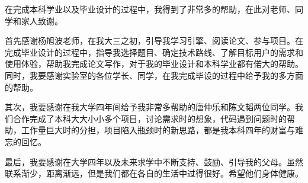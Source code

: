 \begin{thanks}

  在完成本科学业以及毕业设计的过程中，我得到了非常多的帮助，在此对老师、同学和家人致谢。
  
  首先感谢杨旭波老师，在我大三之初，引导我学习引擎、阅读论文、参与项目。在完成毕业设计的过程中，指导我选择题目、确定技术路线、了解目标用户的需求和使用体验，帮助我完成论文写作，对于我的毕业设计和本科学业都有偌大的帮助。同时，我要感谢实验室的各位学长、同学，在我完成毕设的过程中给予我的多方面的帮助。

  其次，我要感谢在我大学四年间给予我非常多帮助的唐仲乐和陈文韬两位同学。我们合作完成了本科大大小小多个项目，讨论需求时的想象，代码遇到问题时的帮助，工作量巨大时的分担，项目陷入瓶颈时的新思路，都是我本科四年的财富与难忘的回忆。
  
  最后，我要感谢在大学四年以及未来求学中不断支持、鼓励、引导我的父母。虽然联系渐少，距离渐远，但是我们都在各自的生活中过得很好。希望他们身体健康。
    
\end{thanks}

